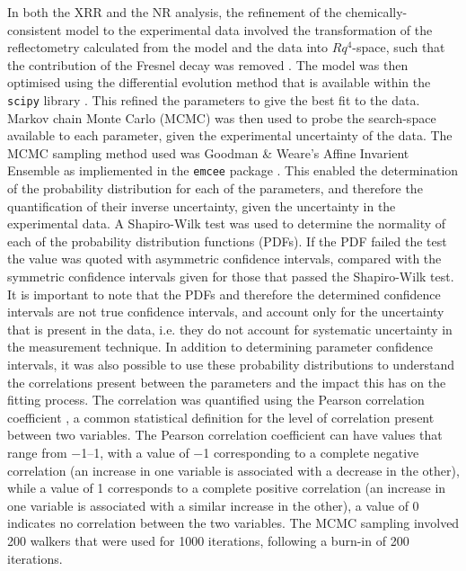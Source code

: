 In both the XRR and the NR analysis, the refinement of the chemically-consistent model to the experimental data involved the transformation of the reflectometry calculated from the model and the data into $Rq^4$-space, such that the contribution of the Fresnel decay was removed \cite{gerelli_aurore_2016}.
The model was then optimised using the differential evolution method that is available within the \texttt{scipy} library \cite{jones_scipy_nodate}.
This refined the parameters to give the best fit to the data.
Markov chain Monte Carlo (MCMC) was then used to probe the search-space available to each parameter, given the experimental uncertainty of the data.
The MCMC sampling method used was Goodman \& Weare's Affine Invarient Ensemble \cite{goodman_ensemble_2010} as impliemented in the \texttt{emcee} package \cite{foreman-mackey_emcee_2013}.
This enabled the determination of the probability distribution for each of the parameters, and therefore the quantification of their inverse uncertainty, given the uncertainty in the experimental data.
A Shapiro-Wilk test \cite{shapiro_analysis_1965} was used to determine the normality of each of the probability distribution functions (PDFs).
If the PDF failed the test the value was quoted with asymmetric confidence intervals, compared with the symmetric confidence intervals given for those that passed the Shapiro-Wilk test.
It is important to note that the PDFs and therefore the determined confidence intervals are not true confidence intervals, and account only for the uncertainty that is present in the data, i.e. they do not account for systematic uncertainty in the measurement technique.
In addition to determining parameter confidence intervals, it was also possible to use these probability distributions to understand the correlations present between the parameters and the impact this has on the fitting process.
The correlation was quantified using the Pearson correlation coefficient \cite{pearson_notes_1895}, a common statistical definition for the level of correlation present between two variables.
The Pearson correlation coefficient can have values that range from \numrange{-1}{1}, with a value of \num{-1} corresponding to a complete negative correlation (an increase in one variable is associated with a decrease in the other), while a value of \num{1} corresponds to a complete positive correlation (an increase in one variable is associated with a similar increase in the other), a value of \num{0} indicates no correlation between the two variables.
The MCMC sampling involved 200 walkers that were used for 1000 iterations, following a burn-in of 200 iterations.
